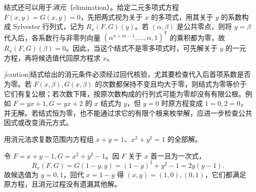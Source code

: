结式还可以用于\emph{消元}（elimination）。给定二元多项式方程 $F(x,y)=G(x,y)=0$，先把两式视为关于 $x$ 的多项式，用其关于 $y$ 的系数构成 Sylvester 行列式，记为 $R_x(F,G)(y)$。若 $(\alpha,\beta)$ 是公共零点，则将 $y=\beta$ 代入后，各系数行与非零列向量 $(\alpha^{n+m-1},\ldots,\alpha,1)^{\mathsf T}$ 的乘积都为零，故 $R_x(F,G)(\beta)=0$。因此，当这个结式不是零多项式时，可先解关于 $y$ 的一元方程，再将候选值代回原方程求 $x$。

\emph[caution]{结式给出的消元条件必须经过回代核验，尤其要检查代入后首项系数是否为零。}若 $F(x,\beta),G(x,\beta)$ 的次数都保持不变且均大于零，则结式为零等价于它们有复公根；若次数下降，按原次数构成的行列式可能为零却没有有限公根。例如 $F=yx+1,G=yx+2$ 的 $x$ 结式为 $y$，但 $y=0$ 时原方程变成 $1=0,2=0$，并无解。若结式恒为零，也不能通过求它的有限个根来枚举解，应进一步检查公共因式或改变消元方式。

\begin{example}
用消元法求复数范围内方程组 $x+y=1$、$x^2+y^2=1$ 的全部解。
\end{example}
\begin{solve}
令 $F=x+y-1,G=x^2+y^2-1$。因 $F$ 关于 $x$ 首一且为一次式，
\[
    R_x(F,G)=G(1-y,y)=(1-y)^2+y^2-1=2y(y-1).
\]
故候选值为 $y=0,1$，回代 $x=1-y$ 得 $(x,y)=(1,0),(0,1)$，它们都满足原方程，且消元过程没有遗漏其他解。
\end{solve}






